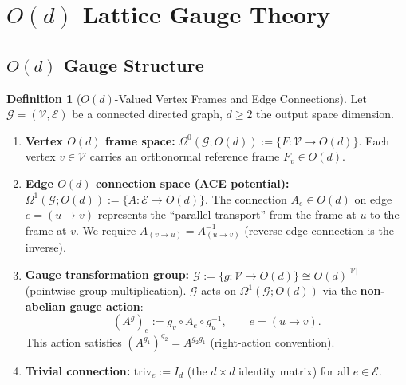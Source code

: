 \documentclass[12pt,a4paper]{article}
\theoremstyle{definition}
\newtheorem{definition}{Definition}[section]
\theoremstyle{remark}
\theoremstyle{definition}
\newcommand{\Od}{O(d)}
\newcommand{\grph}{\mathcal{G}}
\newcommand{\verts}{\mathcal{V}}
\newcommand{\edgs}{\mathcal{E}}
\newcommand{\triv}{\mathrm{triv}}
\begin{document}
\newpage

\section{$O(d)$ Lattice Gauge Theory}
\label{sec:od}

\subsection{$O(d)$ Gauge Structure}

\begin{definition}[$O(d)$-Valued Vertex Frames and Edge Connections]\label{def:od_gauge}
Let $\grph = (\verts, \edgs)$ be a connected directed graph, $d \geq 2$ the output space dimension.

\begin{enumerate}[label=(\alph*)]
    \item \textbf{Vertex $O(d)$ frame space:}
    $\Omega^0(\grph; \Od) := \{F: \verts \to \Od\}$.
    Each vertex $v \in \verts$ carries an orthonormal reference frame $F_v \in \Od$.

    \item \textbf{Edge $O(d)$ connection space (ACE potential):}
    $\Omega^1(\grph; \Od) := \{A: \edgs \to \Od\}$.
    The connection $A_e \in \Od$ on edge $e = (u \to v)$ represents the ``parallel transport'' from the frame at $u$ to the frame at $v$.
    We require $A_{(v \to u)} = A_{(u \to v)}^{-1}$ (reverse-edge connection is the inverse).

    \item \textbf{Gauge transformation group:}
    $\mathcal{G} := \{g: \verts \to \Od\} \cong \Od^{|\verts|}$ (pointwise group multiplication).
    $\mathcal{G}$ acts on $\Omega^1(\grph; \Od)$ via the \textbf{non-abelian gauge action}:
    \[
        (A^g)_e := g_v \circ A_e \circ g_u^{-1}, \qquad e = (u \to v).
    \]
    This action satisfies $(A^{g_1})^{g_2} = A^{g_2 g_1}$ (right-action convention).

    \item \textbf{Trivial connection:} $\triv_e := I_d$ (the $d \times d$ identity matrix) for all $e \in \edgs$.
\end{enumerate}
\end{definition}
\end{document}
